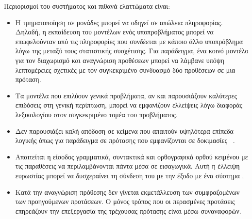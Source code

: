 Περιορισμοί του συστήματος και πιθανά ελαττώματα είναι:
\begin{itemize}
    \item Η τμηματοποίηση σε μονάδες μπορεί να οδηγεί σε απώλεια πληροφορίας.
          Δηλαδή, η εκπαίδευση του μοντέλων ενός υποπροβλήματος μπορεί να επωφελούνταν από τις πληροφορίες που συνδέεται με κάποιο άλλο υποπρόβλημα λόγω της μεταξύ τους στατιστικής συσχέτισης.
          Για παράδειγμα, ένα κοινό μοντέλο για τον διαχωρισμό και αναγνώριση προθέσεων μπορεί να λάμβανε υπόψη λεπτομέρειες σχετικές με τον συγκεκριμένο συνδυασμό δύο προθέσεων σε μια πρόταση.
    \item Τα μοντέλα που επιλύουν γενικά προβλήματα, αν και παρουσιάζουν καλύτερες επιδόσεις στη γενική περίπτωση, μπορεί να εμφανίζουν ελλείψεις λόγω διαφοράς λεξικολογίου στον συγκεκριμένο τομέα του προβλήματος.
    \item Δεν παρουσιάζει καλή απόδοση σε κείμενα που απαιτούν υψηλότερα επίπεδα λογικής όπως για παράδειγμα σε πρότασης που εμφανίζονται σε δοκιμασίες ~\cite{levesque2012winograd}.
    \item Απαιτείται η είσοδος γραμματικά, συντακτικά και ορθογραφικά ορθού κειμένου με τις παραθέσεις να περιλαμβάνονται πάντα μέσα σε εισαγωγικά.
          Αυτή η έλλειψη ευρωστίας μπορεί να δυσχεραίνει τη σύνδεση του \projectname{} με την έξοδο με ένα σύστημα .
    \item Κατά την αναγνώριση πρόθεσης δεν γίνεται εκμετάλλευση των συμφραζομένων των προηγούμενων προτάσεων.
          Ο μόνος τρόπος που οι περασμένες προτάσεις επηρεάζουν την επεξεργασία της τρέχουσας πρότασης είναι μέσω συναναφορών.
\end{itemize}

